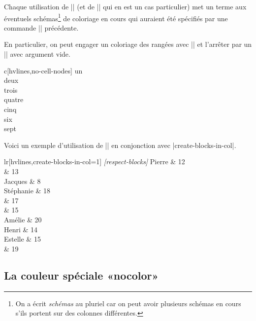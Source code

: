 \documentclass[dvipsnames]{article}
\let\myrlap\rlap
\begin{document}
\goodbreak
\vspace{1cm}
Chaque utilisation de |\rowlistcolors| (et de |\rowcolors| qui en est un cas
particulier) met un terme aux éventuels schémas\footnote{On a écrit
  \emph{schémas} au pluriel car on peut avoir plusieurs schémas en cours s'ils
  portent sur des colonnes différentes.} de coloriage en cours qui auraient été
spécifiés par une commande |\rowlistcolors| précédente.

En particulier, on peut engager un coloriage des rangées avec
|| et l'arrêter par un |\rowlistcolors{}| avec argument vide.

\bigskip
\begin{Code}[width=10cm,show-output]
\begin{NiceTabular}{c}[hvlines,no-cell-nodes] %
  un \\
  deux \\
  \emph{}
  trois \\
  quatre \\
  cinq \\
  \emph{\rowlistcolors{}}
  six \\
  sept \\
\end{NiceTabular}
\end{Code}

\bigskip
Voici un exemple d'utilisation de |\rowcolors| en conjonction avec |create-blocks-in-col|.

\medskip
\begin{Code}[width=11cm,show-output]
\begin{NiceTabular}{lr}[hvlines,create-blocks-in-col=1]
  \emph{[respect-blocks]}
  Pierre    & 12 \\
            & 13 \\
  Jacques   &  8 \\
  Stéphanie & 18 \\
            & 17 \\
            & 15 \\
  Amélie    & 20 \\
  Henri     & 14 \\
  Estelle   & 15 \\
            & 19
\end{NiceTabular}
\end{Code}

\subsection{La couleur spéciale «nocolor»}
\end{document}
